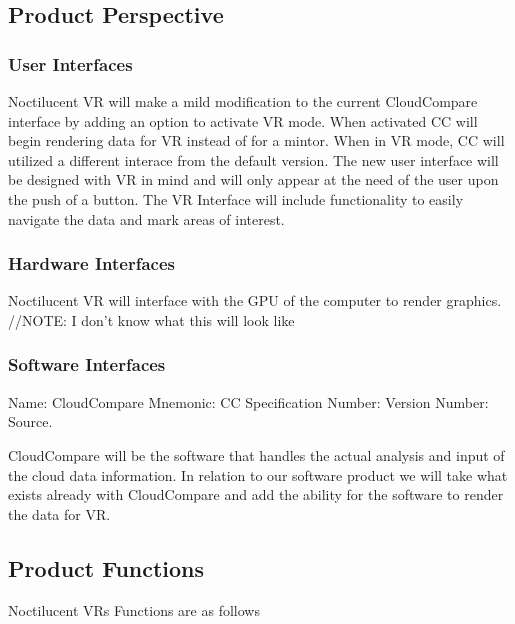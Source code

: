 \documentclass[titlepage]{article}
\begin{document}
\subsection{Product Perspective}

\subsubsection{User Interfaces}

Noctilucent VR will make a mild modification to the current CloudCompare interface by adding an option to activate VR mode. 
When activated CC will begin rendering data for VR instead of for a mintor.
When in VR mode, CC will utilized a different interace from the default version.
The new user interface will be designed with VR in mind and will only appear at the need of the user upon the push of a button.
The VR Interface will include functionality to easily navigate the data and mark areas of interest.

\subsubsection{Hardware Interfaces}

Noctilucent VR will interface with the GPU of the computer to render graphics.
//NOTE: I don't know what this will look like

\subsubsection{Software Interfaces}

Name: CloudCompare
Mnemonic: CC
Specification Number:
Version Number:
Source.

CloudCompare will be the software that handles the actual analysis and input of the cloud data information. 
In relation to our software product we will take what exists already with CloudCompare and add the ability for the software to render the data for VR.

\subsection{Product Functions}

Noctilucent VRs Functions are as follows

\end{document}
